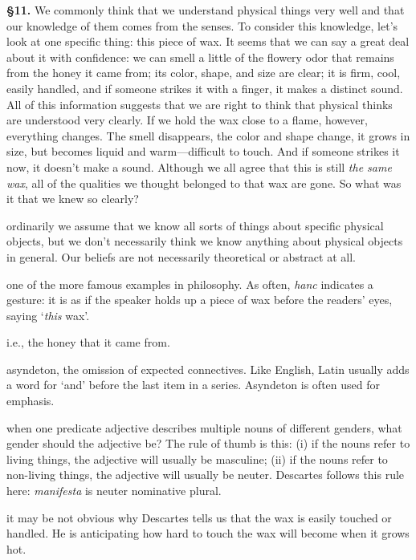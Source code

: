 \textbf{§11.} We commonly think that we understand physical things very well and that our knowledge of them comes from the senses. To consider this knowledge, let's look at one specific thing: this piece of wax. It seems that we can say a great deal about it with confidence: we can smell a little of the flowery odor that remains from the honey it came from; its color, shape, and size are clear; it is firm, cool, easily handled, and if someone strikes it with a finger, it makes a distinct sound. All of this information suggests that we are right to think that physical thinks are understood very clearly. If we hold the wax close to a flame, however, everything changes. The smell disappears, the color and shape change, it grows in size, but becomes liquid and warm---difficult to touch. And if someone strikes it now, it doesn't make a sound. Although we all agree that this is still \textit{the same wax}, all of the qualities we thought belonged to that wax are gone. So what was it that we knew so clearly?

 ordinarily we assume that we know all sorts of things about specific physical objects, but we don't necessarily think we know anything about physical objects in general. Our beliefs are not necessarily theoretical or abstract at all.

 one of the more famous examples in philosophy. As often, \textit{hanc} indicates a gesture: it is as if the speaker holds up a piece of wax before the readers' eyes, saying `\textit{this} wax'.

 i.e., the honey that it came from.

 asyndeton, the omission of expected connectives. Like English, Latin usually adds a word for `and' before the last item in a series. Asyndeton is often used for emphasis.

 when one predicate adjective describes multiple nouns of different genders, what gender should the adjective be? The rule of thumb is this: (i) if the nouns refer to living things, the adjective will usually be masculine; (ii) if the nouns refer to non-living things, the adjective will usually be neuter. Descartes follows this rule here: \textit{manifesta} is neuter nominative plural.

 it may be not obvious why Descartes tells us that the wax is easily touched or handled. He is anticipating how hard to touch the wax will become when it grows hot.

